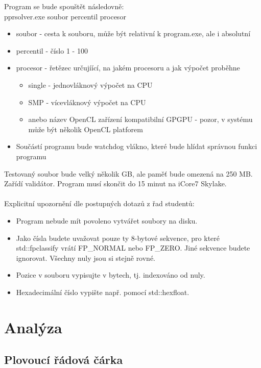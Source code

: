 \documentclass[12pt, a4paper]{article}
\begin{document}
\noindent Program se bude spouštět následovně: \\

\noindent pprsolver.exe soubor percentil procesor
\begin{itemize}
\item soubor - cesta k souboru, může být relativní k program.exe, ale i absolutní
\item percentil - číslo 1 - 100
\item procesor - řetězec určujíící, na jakém procesoru a jak výpočet proběhne
\begin{itemize}
\item single - jednovláknový výpočet na CPU
\item SMP - vícevláknový výpočet na CPU
\item anebo název OpenCL zařízení kompatibilní GPGPU - pozor, v systému může být několik OpenCL platforem
\end{itemize}
\item Součástí programu bude watchdog vlákno, které bude hlídat správnou funkci programu
\end{itemize}
Testovaný soubor bude velký několik GB, ale paměť bude omezená na 250 MB. Zařídí validátor. Program musí skončit do 15 minut na iCore7 Skylake. \\
\\
\noindent Explicitní upozornění dle postupných dotazů z řad studentů:
\begin{itemize}
\item Program nebude mít povoleno vytvářet soubory na disku.
\item Jako čísla budete uvažovat pouze ty 8-bytové sekvence, pro které std::fpclassify vrátí FP\_NORMAL nebo FP\_ZERO. Jiné sekvence budete ignorovat. Všechny nuly jsou si stejně rovné.
\item Pozice v souboru vypisujte v bytech, tj. indexováno od nuly.
\item Hexadecimální číslo vypište např. pomocí std::hexfloat.
\end{itemize}

\newpage







\section{Analýza}
\subsection{Plovoucí řádová čárka}
\end{document}
